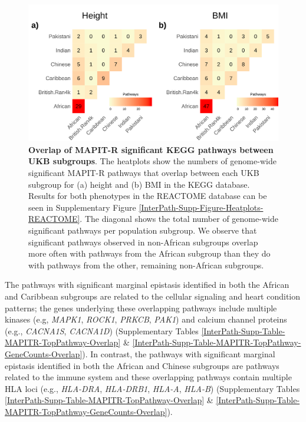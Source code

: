\documentclass[12pt,a4paper]{article}
\begin{document}
\begin{figure}[htb]
\centering
\includegraphics[scale=.225]{Images/Main/InterPath_Main_Figure_Heatplots_KEGG_vs4.png}
\caption[TBD]{\textbf{Overlap of MAPIT-R significant KEGG pathways between UKB subgroups}. The heatplots show the numbers of genome-wide significant MAPIT-R pathways that overlap between each UKB subgroup for (a) height and (b) BMI in the KEGG database. Results for both phenotypes in the REACTOME database can be seen in Supplementary Figure \ref{InterPath-Supp-Figure-Heatplots-REACTOME}. The diagonal shows the total number of genome-wide significant pathways per population subgroup. We observe that significant pathways observed in non-African subgroups overlap more often with pathways from the African subgroup than they do with pathways from the other, remaining non-African subgroups.}
\label{InterPath-Main-Figure-Heatplots-KEGG}
\end{figure}

The pathways with significant marginal epistasis identified in both the African and Caribbean subgroups are related to the cellular signaling and heart condition patterns; the genes underlying these overlapping pathways include multiple kinases (e.g, {\emph{MAPK1}}, {\emph{ROCK1}}, {\emph{PRKCB}}, {\emph{PAK1}}) and calcium channel proteins (e.g., {\emph{CACNA1S}}, {\emph{CACNA1D}}) (Supplementary Tables \ref{InterPath-Supp-Table-MAPITR-TopPathway-Overlap} \& \ref{InterPath-Supp-Table-MAPITR-TopPathway-GeneCounts-Overlap}). In contrast, the pathways with significant marginal epistasis identified in both the African and Chinese subgroups are pathways related to the immune system and these overlapping pathways contain multiple HLA loci (e.g., {\emph{HLA-DRA}}, {\emph{HLA-DRB1}}, {\emph{HLA-A}}, {\emph{HLA-B}})  (Supplementary Tables \ref{InterPath-Supp-Table-MAPITR-TopPathway-Overlap} \& \ref{InterPath-Supp-Table-MAPITR-TopPathway-GeneCounts-Overlap}).
\end{document}
